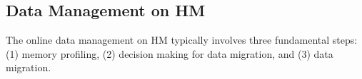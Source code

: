 \begin{comment}
Using CPU for training has the following four benefits. 
\textit{First}, compared with GPU, CPU is more approachable and affordable. Some data centers do not have GPU and simply use CPU for training. Such examples include the Cori in Lawrence Berkeley National Lab and \textcolor{red}{xxx} in TACC for scientific machine learning \textcolor{red}{xxx}. \textit{Second}, for those DNN models that lack thread level parallelism, GPU can perform worse than CPU. For example, training the wide-and-deep model \textcolor{red}{[xxx]} and DQN, CPU performs \textcolor{red}{[xxx]} faster than GPU (Using xxx CPU and xxx GPU for training, the training throughput is xxx and xxx respectively). \textit{Third}, on a public cloud, reserving CPU is cheaper than reserving GPU. When the training throughputs on CPU and GPU are comparable, using CPU can be easily more cost effective. \textit{Fourth}, the CPU-based machine provides a much larger memory capacity than the GPU one, allowing more use cases such as co-locating multiple DNN training workloads in a virtualization environment or automatic machine learning~\cite{}. 
\end{comment}




\subsection{Data Management on HM}
The online data management on HM typically involves three fundamental steps: (1) memory profiling, (2) decision making for data migration, and (3) data migration. 

